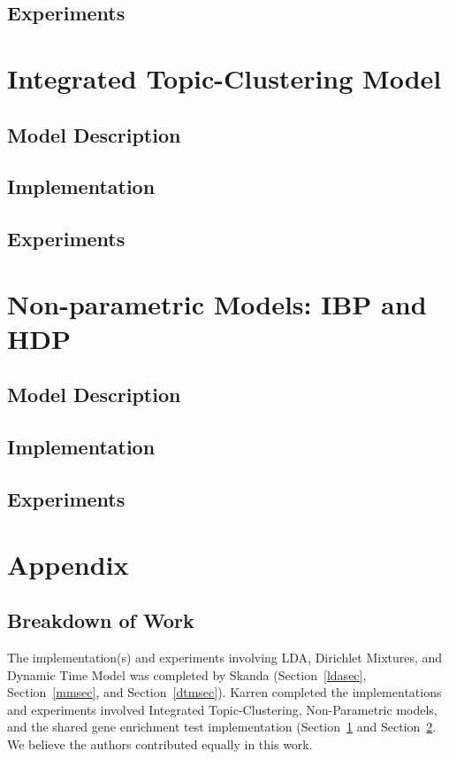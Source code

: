 \documentclass{article}
\begin{document}
\subsection{Experiments} 


\section{Integrated Topic-Clustering Model} 
\label{intsec}
\subsection{Model Description} 
\subsection{Implementation} 
\subsection{Experiments} 



\section{Non-parametric Models: IBP and HDP} 
\label{nonparametricsec}
\subsection{Model Description} 
\subsection{Implementation} 
\subsection{Experiments} 







\section{Appendix} 

\subsection{Breakdown of Work}
The implementation(s) and experiments involving LDA, Dirichlet Mixtures, and Dynamic Time Model was completed by Skanda (Section~\ref{ldasec}, Section~\ref{mmsec}, and Section~\ref{dtmsec}). Karren completed the implementations and experiments involved Integrated Topic-Clustering, Non-Parametric models, and the shared gene enrichment test implementation (Section~\ref{intsec} and Section~\ref{nonparametricsec}. We believe the authors contributed equally in this work.
\end{document}
